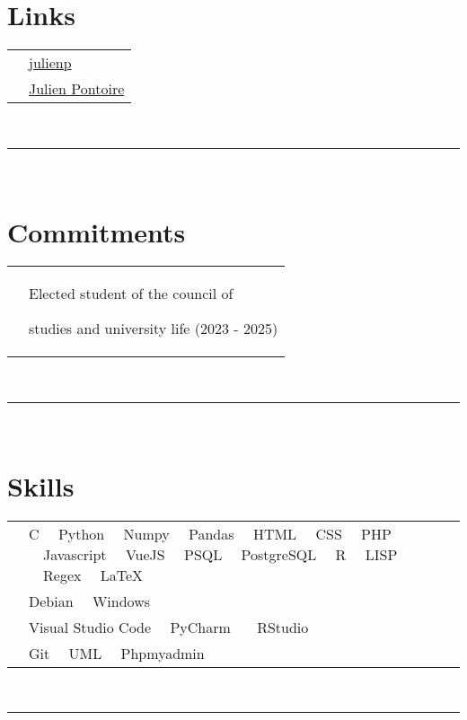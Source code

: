 \documentclass[oneside]{article}
\begin{document}
{\begin{minipage}[t][\textheight-2\fboxsep-2\fboxrule][t]{\dimexpr0.40\textwidth-2\fboxrule-2\fboxsep\relax}
        \section*{\large Links}
        \begin{tabular}{cl}
            \faGithub{}   & \href{https://github.com/Jean-Pedro}{julienp} \\
            \faLinkedin{} & \href{https://www.linkedin.com/in/julien-pontoire-0a50a42b1/}{Julien Pontoire} \\
        \end{tabular}
        \vspace{10pt} \\
        \rule{\linewidth}{0.4pt} \\

        \section*{\large Commitments}
        \begin{tabularx}{\textwidth}{cY}
            & Elected student of the council of 
            
            studies and university life (2023 - 2025)
        \end{tabularx}
        \vspace{7pt} \\
        \rule{\linewidth}{0.4pt} \\
        \section*{\large Skills}
        \begin{tabularx}{\textwidth}{cY}
            \faCode{}        & C \ \ Python \ \ Numpy \ \ Pandas \ \ HTML \ \ CSS \ \ PHP \ \ Javascript \ \ VueJS \ \ PSQL \ \ PostgreSQL \ \ R \ \ LISP \ \ Regex \ \ LaTeX \\
            \faCogs{}        & Debian \ \ Windows \\
            \faLaptopCode{}  & Visual Studio Code \ \ PyCharm \ \ \ RStudio \\
            \faToolbox{}     & Git \ \ UML \ \ Phpmyadmin
        \end{tabularx}
        \vspace{1pt} \\
        \rule{\linewidth}{0.4pt}
        

\end{minipage}}
\end{document}
